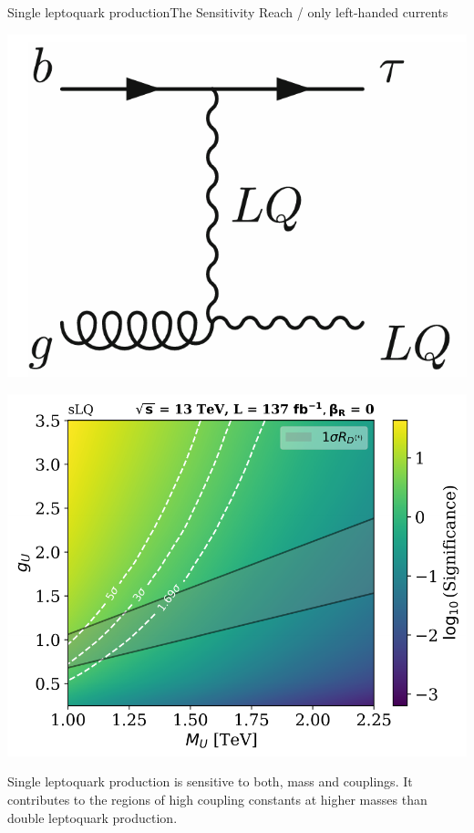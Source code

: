 \documentclass{../bredelebeamer}
\begin{document}
\begin{frame}{Single leptoquark production}{The Sensitivity Reach / only left-handed currents}
	\begin{minipage}{.30\linewidth}
		\includegraphics[width=\linewidth]{single_LQ.png}
	\end{minipage}
	\begin{minipage}{.68\linewidth}
		\includegraphics[width=\linewidth]{Significance_Heatmap_13TeV_L137_sLQ_combined_woRHC.pdf}
	\end{minipage}
	{\large
		  Single leptoquark production is sensitive to both, mass and couplings. It contributes to the regions of high coupling constants at higher masses than double leptoquark production.
	}
\end{frame}
\end{document}
